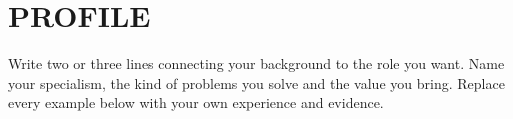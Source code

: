 \section{PROFILE}
Write two or three lines connecting your background to the role you want.
Name your specialism, the kind of problems you solve and the value you bring.
Replace every example below with your own experience and evidence.
